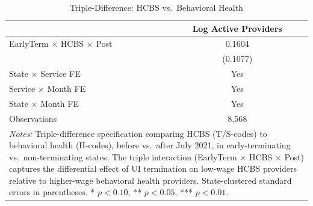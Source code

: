 \begin{table}[htbp]
\centering
\caption{Triple-Difference: HCBS vs.\ Behavioral Health}
\label{tab:triple_diff}
\begin{tabular}{lc}
\hline\hline
 & Log Active Providers \\
\hline
EarlyTerm $\times$ HCBS $\times$ Post & 0.1604 \\
 & (0.1077) \\
\hline
State $\times$ Service FE & Yes \\
Service $\times$ Month FE & Yes \\
State $\times$ Month FE & Yes \\
Observations & 8,568 \\
\hline\hline
\multicolumn{2}{p{10cm}}{\footnotesize \textit{Notes:} Triple-difference specification comparing HCBS (T/S-codes) to behavioral health (H-codes), before vs.\ after July 2021, in early-terminating vs.\ non-terminating states. The triple interaction (EarlyTerm $\times$ HCBS $\times$ Post) captures the differential effect of UI termination on low-wage HCBS providers relative to higher-wage behavioral health providers. State-clustered standard errors in parentheses. * $p<0.10$, ** $p<0.05$, *** $p<0.01$.} \\
\end{tabular}
\end{table}

